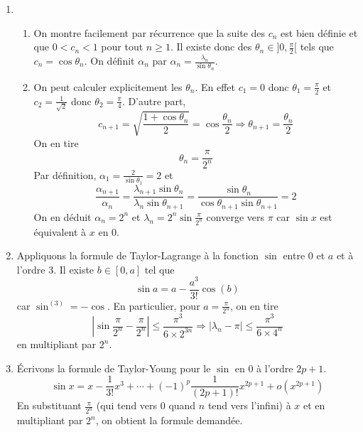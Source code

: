 \begin{enumerate}
 \item 
\begin{enumerate}
 \item On montre facilement par récurrence que la suite des $c_n$ est bien définie et que $0<c_n<1$ pour tout $n\geq 1$. Il existe donc des $\theta_n \in ]0 ,\frac{\pi}{2}[$ tels que $c_n=\cos \theta_n$. On définit $\alpha_n$ par $\alpha_n = \frac{\lambda_n}{\sin \theta_n}$.
 \item On peut calculer explicitement les $\theta_n$. En effet $c_1=0$ donc $\theta_1=\frac{\pi}{2}$ et $c_2=\frac{1}{\sqrt{2}}$ donc $\theta_2=\frac{\pi}{4}$. D'autre part,
\begin{displaymath}
 c_{n+1}=\sqrt{\frac{1+\cos \theta_n}{2}} = \cos \frac{\theta_n}{2}\Rightarrow \theta_{n+1}=\frac{\theta_n}{2}
\end{displaymath}
On en tire
\begin{displaymath}
 \theta_n = \frac{\pi}{2^n}
\end{displaymath}
Par définition, $\alpha_1=\frac{2}{\sin \theta_1}=2$ et
\begin{displaymath}
 \frac{\alpha_{n+1}}{\alpha_n} = \frac{\lambda_{n+1} \sin\theta_n}{\lambda_n \sin\theta_{n+1}}
=\frac{\sin \theta_n}{\cos \theta_{n+1}\sin \theta_{n+1}} =2
\end{displaymath}
On en déduit $\alpha_n = 2^n$ et $\lambda_n = 2^n \sin \frac{\pi}{2^n}$ converge vers $\pi$ car $\sin x$ est équivalent à $x$ en $0$.
\end{enumerate}

 \item Appliquons la formule de Taylor-Lagrange à la fonction $\sin$ entre $0$ et $a$ et à l'ordre $3$. Il existe $b\in[0,a]$ tel que
\begin{displaymath}
 \sin a = a -\frac{a^3}{3!} \cos(b)
\end{displaymath}
car $\sin^{(3)}=-\cos$. En particulier, pour $a=\frac{\pi}{2^n}$, on en tire
\begin{displaymath}
 \left| \sin \frac{\pi}{2^n} - \frac{\pi}{2^n}\right|\leq \frac{\pi^3}{6\times 2^{3n}}
\Rightarrow
 \left| \lambda_n - \pi\right| \leq \frac{\pi^3}{6\times 4^{n}}
\end{displaymath}
en multipliant par $2^n$.
 
 \item \'Ecrivons la formule de Taylor-Young pour le $\sin$ en $0$ à l'ordre $2p+1$.
\begin{displaymath}
 \sin x = x -\frac{1}{3!}x^3 + \cdots + (-1)^p\frac{1}{(2p+1)!}x^{2p+1} + o(x^{2p+1})
\end{displaymath}
 En substituant $\frac{\pi}{2^n}$ (qui tend vers $0$ quand $n$ tend vers l'infini) à $x$ et en multipliant par $2^n$, on obtient la formule demandée.


\end{enumerate}
